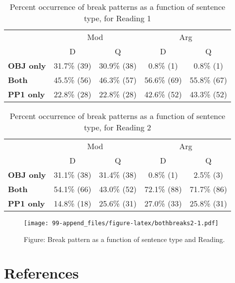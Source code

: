 \documentclass[11pt,oneside]{book}
\begin{document}
\centering

\begin{table}[!h]

\caption{\label{tab:r1bothbreaks}Percent occurrence of break patterns as a function of sentence type, for Reading 1}
\centering
\begin{tabular}{>{\bfseries}lcccc}
\toprule
\multicolumn{1}{c}{ } & \multicolumn{2}{c}{Mod} & \multicolumn{2}{c}{Arg} \\
\cmidrule(l{3pt}r{3pt}){2-3} \cmidrule(l{3pt}r{3pt}){4-5}
  & D & Q & D & Q\\
\midrule
OBJ only & 31.7\% (39) & 30.9\% (38) & 0.8\% (1) & 0.8\% (1)\\
Both & 45.5\% (56) & 46.3\% (57) & 56.6\% (69) & 55.8\% (67)\\
PP1 only & 22.8\% (28) & 22.8\% (28) & 42.6\% (52) & 43.3\% (52)\\
\bottomrule
\end{tabular}
\end{table}

\begin{table}[!h]

\caption{\label{tab:r2bothbreaks}Percent occurrence of break patterns as a function of sentence type, for Reading 2}
\centering
\begin{tabular}{>{\bfseries}lcccc}
\toprule
\multicolumn{1}{c}{ } & \multicolumn{2}{c}{Mod} & \multicolumn{2}{c}{Arg} \\
\cmidrule(l{3pt}r{3pt}){2-3} \cmidrule(l{3pt}r{3pt}){4-5}
  & D & Q & D & Q\\
\midrule
OBJ only & 31.1\% (38) & 31.4\% (38) & 0.8\% (1) & 2.5\% (3)\\
Both & 54.1\% (66) & 43.0\% (52) & 72.1\% (88) & 71.7\% (86)\\
PP1 only & 14.8\% (18) & 25.6\% (31) & 27.0\% (33) & 25.8\% (31)\\
\bottomrule
\end{tabular}
\end{table}

\begin{figure}
\centering
\texttt{[image: 99-append\_files/figure-latex/bothbreaks2-1.pdf]}
\caption{\label{fig:bothbreaks2}Figure: Break pattern as a function of sentence type and Reading.}
\end{figure}

\hypertarget{references}{%
\chapter*{References}\label{references}}
\end{document}
